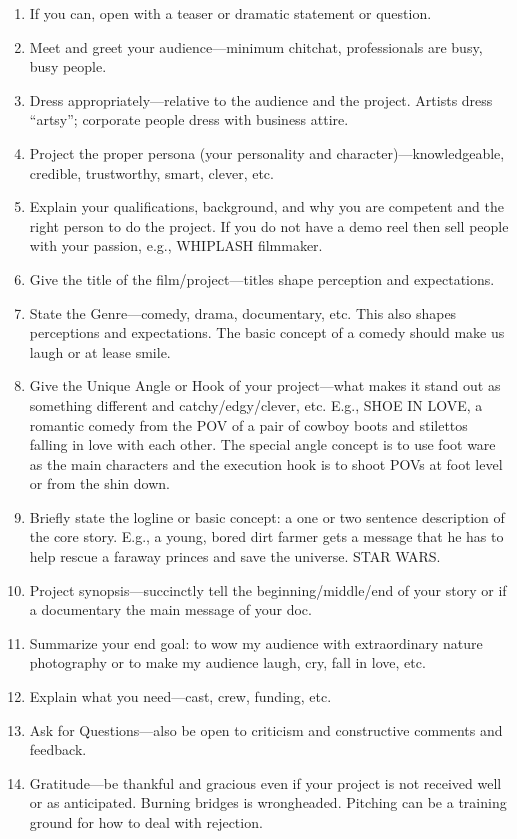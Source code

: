 \documentclass[
  letterpaper,
  DIV=11,
  numbers=noendperiod]{scrreprt}
\providecommand{\tightlist}{%
  \setlength{\itemsep}{0pt}\setlength{\parskip}{0pt}}\usepackage{longtable,booktabs,array}
\begin{document}
\begin{tcolorbox}
\begin{enumerate}
\def\labelenumi{\arabic{enumi}.}
\tightlist
\item
  If you can, open with a teaser or dramatic statement or question.
\item
  Meet and greet your audience---minimum chitchat, professionals are
  busy, busy people.
\item
  Dress appropriately---relative to the audience and the project.
  Artists dress ``artsy''; corporate people dress with business attire.
\item
  Project the proper persona (your personality and
  character)---knowledgeable, credible, trustworthy, smart, clever, etc.
\item
  Explain your qualifications, background, and why you are competent and
  the right person to do the project. If you do not have a demo reel
  then sell people with your passion, e.g., WHIPLASH filmmaker.
\item
  Give the title of the film/project---titles shape perception and
  expectations.
\item
  State the Genre---comedy, drama, documentary, etc. This also shapes
  perceptions and expectations. The basic concept of a comedy should
  make us laugh or at lease smile.
\item
  Give the Unique Angle or Hook of your project---what makes it stand
  out as something different and catchy/edgy/clever, etc. E.g., SHOE IN
  LOVE, a romantic comedy from the POV of a pair of cowboy boots and
  stilettos falling in love with each other. The special angle concept
  is to use foot ware as the main characters and the execution hook is
  to shoot POVs at foot level or from the shin down.
\item
  Briefly state the logline or basic concept: a one or two sentence
  description of the core story. E.g., a young, bored dirt farmer gets a
  message that he has to help rescue a faraway princes and save the
  universe. STAR WARS.
\item
  Project synopsis---succinctly tell the beginning/middle/end of your
  story or if a documentary the main message of your doc.
\item
  Summarize your end goal: to wow my audience with extraordinary nature
  photography or to make my audience laugh, cry, fall in love, etc.
\item
  Explain what you need---cast, crew, funding, etc.
\item
  Ask for Questions---also be open to criticism and constructive
  comments and feedback.
\item
  Gratitude---be thankful and gracious even if your project is not
  received well or as anticipated. Burning bridges is wrongheaded.
  Pitching can be a training ground for how to deal with rejection.
\end{enumerate}


\end{tcolorbox}
\end{document}
